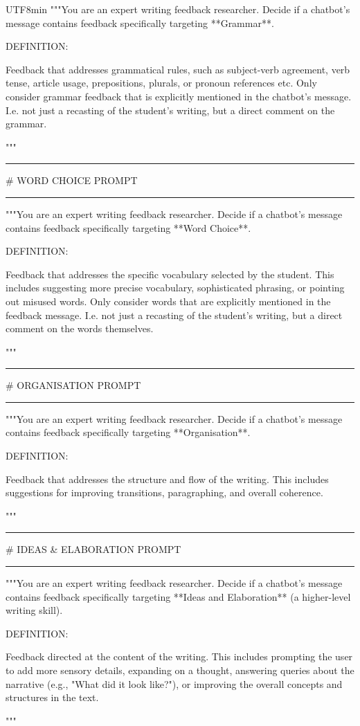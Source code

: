 \begin{CJK}{UTF8}{min}
"""You are an expert writing feedback researcher. Decide if a chatbot's message contains feedback specifically targeting **Grammar**.

DEFINITION:

Feedback that addresses grammatical rules, such as subject-verb agreement, verb tense, article usage, prepositions, plurals, or pronoun references etc. Only consider grammar feedback that is explicitly mentioned in the chatbot's message. I.e. not just a recasting of the student's writing, but a direct comment on the grammar.

"""

\medskip\hrule\medskip

\# WORD CHOICE PROMPT

\medskip\hrule\medskip

"""You are an expert writing feedback researcher. Decide if a chatbot's message contains feedback specifically targeting **Word Choice**.

DEFINITION:

Feedback that addresses the specific vocabulary selected by the student. This includes suggesting more precise vocabulary, sophisticated phrasing, or pointing out misused words. Only consider words that are explicitly mentioned in the feedback message. I.e. not just a recasting of the student's writing, but a direct comment on the words themselves.

"""

\medskip\hrule\medskip

\# ORGANISATION PROMPT

\medskip\hrule\medskip

"""You are an expert writing feedback researcher. Decide if a chatbot's message contains feedback specifically targeting **Organisation**.

DEFINITION:

Feedback that addresses the structure and flow of the writing. This includes suggestions for improving transitions, paragraphing, and overall coherence.

"""

\medskip\hrule\medskip

\# IDEAS \& ELABORATION PROMPT

\medskip\hrule\medskip

"""You are an expert writing feedback researcher. Decide if a chatbot's message contains feedback specifically targeting **Ideas and Elaboration** (a higher-level writing skill).

DEFINITION:

Feedback directed at the content of the writing. This includes prompting the user to add more sensory details, expanding on a thought, answering queries about the narrative (e.g., "What did it look like?"), or improving the overall concepts and structures in the text.

"""
\end{CJK}

